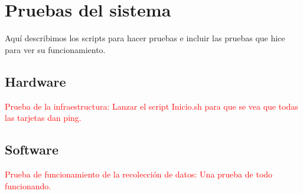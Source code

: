 \section{Pruebas del sistema}
Aquí describimos los scripts para hacer pruebas e incluir las pruebas que hice para ver su funcionamiento.

\subsection{Hardware}
\textcolor{red}{Prueba de la infraestructura: Lanzar el script Inicio.sh para que se vea que todas las tarjetas dan ping.}

\subsection{Software}
%
\textcolor{red}{Prueba de funcionamiento de la recolección de datos: Una prueba de todo funcionando.}